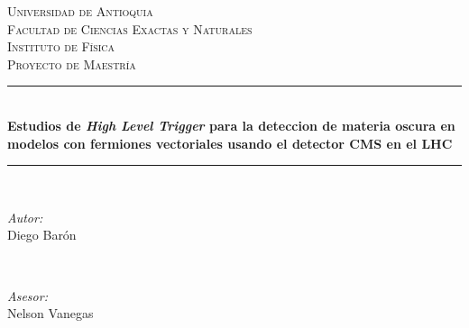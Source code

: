 \begin{titlepage}

\newcommand{\HRule}{\rule{\linewidth}{0.5mm}} %

\center %
 

\textsc{\LARGE Universidad de Antioquia}\\[1.5cm] %
\textsc{\Large Facultad de Ciencias Exactas y Naturales}\\[0.5cm]
\textsc{\Large Instituto de Física}\\[0.5cm]
\textsc{\large Proyecto de Maestría}\\[0.5cm] %


\HRule \\[0.4cm]
{ \huge \bfseries Estudios de \textit{High Level Trigger} para la deteccion de materia oscura en modelos con fermiones vectoriales usando el detector CMS en el LHC}\\[0.4cm] %
\HRule \\[1.5cm]
 

\begin{minipage}{0.4\textwidth}
\begin{flushleft} \large
\emph{Autor:}\\
Diego Barón \textsc{} %
\end{flushleft}
\end{minipage}
~
\begin{minipage}{0.4\textwidth}
\begin{flushright} \large
\emph{Asesor:} \\
Nelson Vanegas \textsc{} %
\end{flushright}
\end{minipage}\\[1.2cm]


\end{titlepage}
